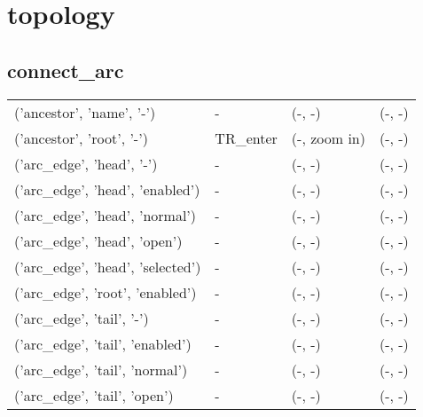 \def\state#1{#1}
\def\object#1{#1}
\def\cursor#1{#1}
\def\leftnextstate#1{#1}
\def\leftaction#1{#1}
\def\rightnextstate#1{#1}
\def\rightaction#1{#1}
\section{topology}
\subsection{connect\_arc}
\begin{tabular}{|l|l|l|l|}
\object{('ancestor', 'name', '-')} &\cursor{-} &(\leftnextstate{-}, \leftaction{-}) &(\rightnextstate{-}, \rightaction{-})\\
\object{('ancestor', 'root', '-')} &\cursor{TR\_enter} &(\leftnextstate{-}, \leftaction{zoom in}) &(\rightnextstate{-}, \rightaction{-})\\
\object{('arc\_edge', 'head', '-')} &\cursor{-} &(\leftnextstate{-}, \leftaction{-}) &(\rightnextstate{-}, \rightaction{-})\\
\object{('arc\_edge', 'head', 'enabled')} &\cursor{-} &(\leftnextstate{-}, \leftaction{-}) &(\rightnextstate{-}, \rightaction{-})\\
\object{('arc\_edge', 'head', 'normal')} &\cursor{-} &(\leftnextstate{-}, \leftaction{-}) &(\rightnextstate{-}, \rightaction{-})\\
\object{('arc\_edge', 'head', 'open')} &\cursor{-} &(\leftnextstate{-}, \leftaction{-}) &(\rightnextstate{-}, \rightaction{-})\\
\object{('arc\_edge', 'head', 'selected')} &\cursor{-} &(\leftnextstate{-}, \leftaction{-}) &(\rightnextstate{-}, \rightaction{-})\\
\object{('arc\_edge', 'root', 'enabled')} &\cursor{-} &(\leftnextstate{-}, \leftaction{-}) &(\rightnextstate{-}, \rightaction{-})\\
\object{('arc\_edge', 'tail', '-')} &\cursor{-} &(\leftnextstate{-}, \leftaction{-}) &(\rightnextstate{-}, \rightaction{-})\\
\object{('arc\_edge', 'tail', 'enabled')} &\cursor{-} &(\leftnextstate{-}, \leftaction{-}) &(\rightnextstate{-}, \rightaction{-})\\
\object{('arc\_edge', 'tail', 'normal')} &\cursor{-} &(\leftnextstate{-}, \leftaction{-}) &(\rightnextstate{-}, \rightaction{-})\\
\object{('arc\_edge', 'tail', 'open')} &\cursor{-} &(\leftnextstate{-}, \leftaction{-}) &(\rightnextstate{-}, \rightaction{-})\\

\end{tabular}
